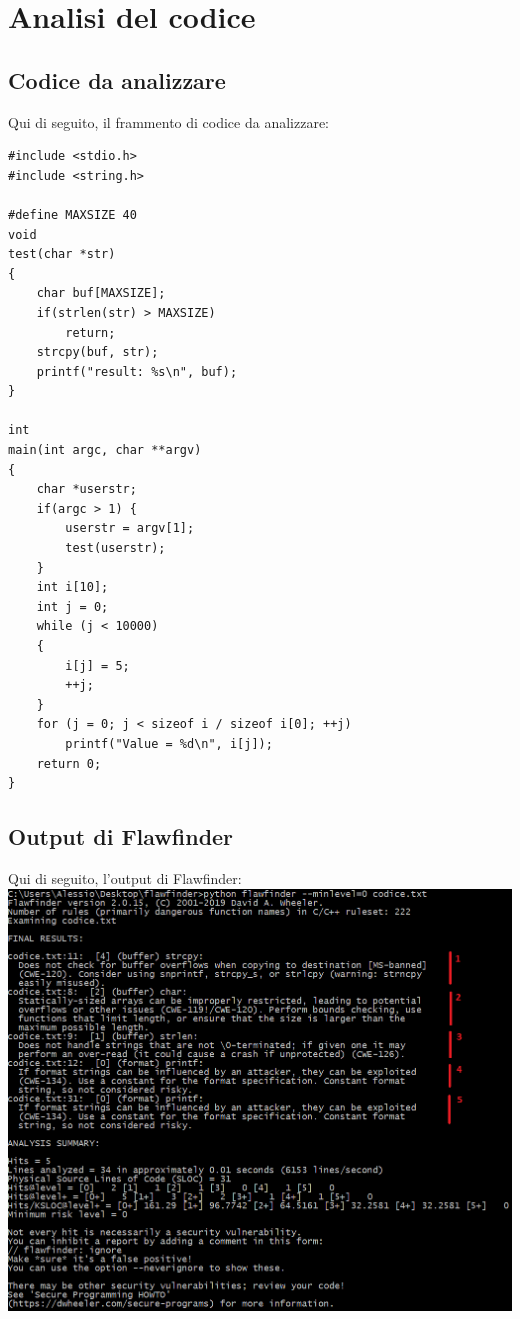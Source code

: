 \documentclass[11pt]{article} %
\begin{document}
\newpage
\section{Analisi del codice}
\subsection{Codice da analizzare}
Qui di seguito, il frammento di codice da analizzare:
\begin{lstlisting}
#include <stdio.h>
#include <string.h>

#define	MAXSIZE	40
void
test(char *str)
{
	char buf[MAXSIZE];
	if(strlen(str) > MAXSIZE)
		return;
	strcpy(buf, str);				 
	printf("result: %s\n", buf);
}

int
main(int argc, char **argv)
{
	char *userstr;
	if(argc > 1) {
		userstr = argv[1];
		test(userstr);
	}
	int i[10];
	int j = 0;
	while (j < 10000)
	{
		i[j] = 5;				 
		++j;
	}
	for (j = 0; j < sizeof i / sizeof i[0]; ++j)
		printf("Value = %d\n", i[j]);
	return 0;
}
\end{lstlisting}
\newpage

\subsection{Output di Flawfinder}
Qui di seguito, l'output di Flawfinder: \newline
\includegraphics[scale=0.6]{output}
\newline
\end{document}
